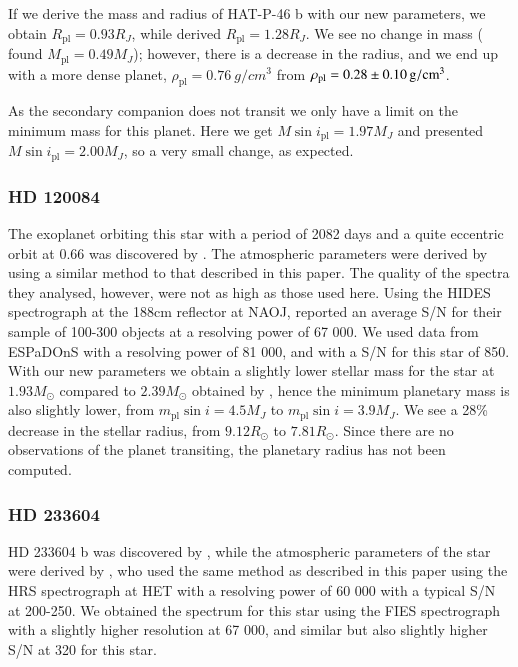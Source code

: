 \documentclass{aa}
\begin{document}
If we derive the mass and radius of HAT-P-46 b with our new parameters, we
obtain $R_\mathrm{pl} = 0.93R_J$, while \citet{Hartmann2014} derived
$R_\mathrm{pl} = 1.28R_J$. We see no change in mass (\citealt{Hartmann2014}
found $M_\mathrm{pl}=0.49M_J$); however, there is a decrease in the radius, and
we end up with a more dense planet, $\rho_\mathrm{pl}=\SI{0.76}{g/cm^3}$ from
$\rho_\mathrm{pl}=\SI{0.28\pm0.10}{g/cm^3}$.

As the secondary companion does not transit we only have a limit on the minimum
mass for this planet. Here we get $M\sin i_\mathrm{pl} = 1.97M_J$ and
\citet{Hartmann2014} presented $M\sin i_\mathrm{pl} = 2.00M_J$, so a very small
change, as expected.


\subsubsection{HD 120084}
\label{sub:HD_120084}
The exoplanet orbiting this star with a period of 2082 days and a quite
eccentric orbit at 0.66 was discovered by \citet{Sato2013}. The atmospheric
parameters were derived by \citet{Takeda2008} using a similar method to that
described in this paper. The quality of the spectra they analysed, however, were
not as high as those used here. Using the HIDES spectrograph at the 188cm
reflector at NAOJ, \citet{Takeda2008} reported an average S/N for their sample
of 100-300 objects at a resolving power of 67 000. We used data from ESPaDOnS
with a resolving power of 81 000, and with a S/N for this star of 850. With our
new parameters we obtain a slightly lower stellar mass for the star at
$1.93M_\odot$ compared to $2.39M_\odot$ obtained by \cite{Takeda2008}, hence the
minimum planetary mass is also slightly lower, from $m_\mathrm{pl}\sin i=4.5M_J$
to $m_\mathrm{pl}\sin i=3.9M_J$. We see a 28\% decrease in the stellar radius,
from $9.12R_\odot$ to $7.81R_\odot$. Since there are no observations of the
planet transiting, the planetary radius has not been computed.


\subsubsection{HD 233604}
\label{sub:HD_233604}
HD 233604 b was discovered by \citet{Nowak2013}, while the atmospheric
parameters of the star were derived by \citet{Zielinski2012}, who used the same
method as described in this paper using the HRS spectrograph at HET with a
resolving power of 60 000 with a typical S/N at 200-250. We obtained the
spectrum for this star using the FIES spectrograph with a slightly higher
resolution at 67 000, and similar but also slightly higher S/N at 320 for this
star.
\end{document}
